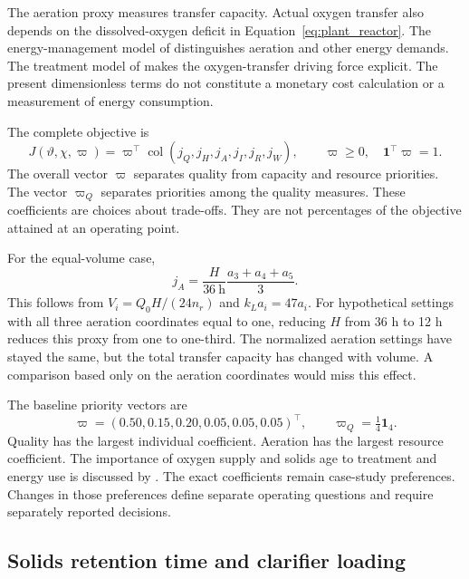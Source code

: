 The aeration proxy measures transfer capacity. Actual oxygen transfer also depends on the dissolved-oxygen deficit in Equation~\eqref{eq:plant_reactor}. The energy-management model of \citet{Miederer2025} distinguishes aeration and other energy demands. The treatment model of \citet{Zhang2026} makes the oxygen-transfer driving force explicit. The present dimensionless terms do not constitute a monetary cost calculation or a measurement of energy consumption.

The complete objective is
\begin{equation}
J(\vartheta,\chi,\varpi)=\varpi^\top
\operatorname{col}(j_Q,j_H,j_A,j_I,j_R,j_W),\qquad
\varpi\ge0,\quad\mathbf1^\top\varpi=1.
\label{eq:plant_engineering_objective}
\end{equation}
The overall vector $\varpi$ separates quality from capacity and resource priorities. The vector $\varpi_Q$ separates priorities among the quality measures. These coefficients are choices about trade-offs. They are not percentages of the objective attained at an operating point.

For the equal-volume case,
\begin{equation}
j_A=\frac{H}{36\ \mathrm{h}}\frac{a_3+a_4+a_5}{3}.
\label{eq:plant_aeration_proxy_example}
\end{equation}
This follows from $V_i=Q_0H/(24n_r)$ and $k_La_i=47a_i$. For hypothetical settings with all three aeration coordinates equal to one, reducing $H$ from 36 h to 12 h reduces this proxy from one to one-third. The normalized aeration settings have stayed the same, but the total transfer capacity has changed with volume. A comparison based only on the aeration coordinates would miss this effect.

The baseline priority vectors are
\begin{equation}
\varpi=(0.50,0.15,0.20,0.05,0.05,0.05)^\top,\qquad
\varpi_Q=\tfrac14\mathbf1_4.
\label{eq:plant_objective_priorities}
\end{equation}
Quality has the largest individual coefficient. Aeration has the largest resource coefficient. The importance of oxygen supply and solids age to treatment and energy use is discussed by \citet{Leu2012}. The exact coefficients remain case-study preferences. Changes in those preferences define separate operating questions and require separately reported decisions.

\subsection{Solids retention time and clarifier loading}


